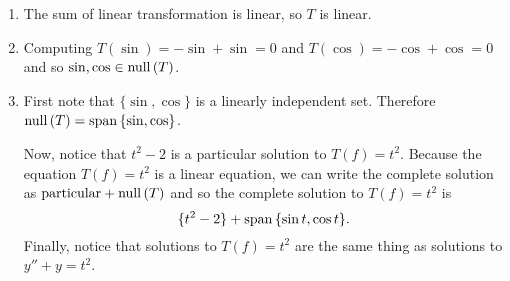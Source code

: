 \begin{enumerate}
\begin{enumerate}
			\item The sum of linear transformation is linear, so $T$ is linear.
			\item Computing $T(\sin) = -\sin+\sin=0$ and $T(\cos) = -\cos+\cos=0$ and so $\sin,\cos\in \mathrm{null}\,(T)$.
			\item First note that $\{\sin,\cos\}$ is a linearly independent set. Therefore $\mathrm{null}\,(T)=\mathrm{span}\,\{\sin,\cos\}$.

			Now, notice that $t^2-2$ is a particular solution to $T(f)=t^2$. Because the equation $T(f)=t^2$ is a linear equation,
			we can write the complete solution as $\text{particular}+\mathrm{null}\,(T)$ and so the complete solution to $T(f)=t^2$ is
			\[
				\{t^2-2\}+\mathrm{span}\,\{\sin t,\cos t\}.
			\]
			Finally, notice that solutions to $T(f)=t^2$ are the same thing as solutions to $y''+y=t^2$.
		\end{enumerate}
\end{enumerate}
	
